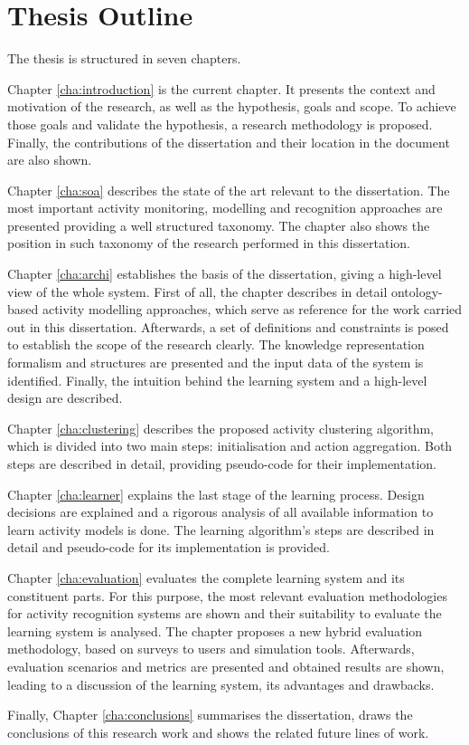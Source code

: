 \section{Thesis Outline}
\label{sec:intro:outline}

The thesis is structured in seven chapters.

Chapter \ref{cha:introduction} is the current chapter. It presents the context and motivation of the research, as well as the hypothesis, goals and scope. To achieve those goals and validate the hypothesis, a research methodology is proposed. Finally, the contributions of the dissertation and their location in the document are also shown.

Chapter \ref{cha:soa} describes the state of the art relevant to the dissertation. The most important activity monitoring, modelling and recognition approaches are presented providing a well structured taxonomy. The chapter also shows the position in such taxonomy of the research performed in this dissertation.

Chapter \ref{cha:archi} establishes the basis of the dissertation, giving a high-level view of the whole system. First of all, the chapter describes in detail ontology-based activity modelling approaches, which serve as reference for the work carried out in this dissertation. Afterwards, a set of definitions and constraints is posed to establish the scope of the research clearly. The knowledge representation formalism and structures are presented and the input data of the system is identified. Finally, the intuition behind the learning system and a high-level design are described.

Chapter \ref{cha:clustering} describes the proposed activity clustering algorithm, which is divided into two main steps: initialisation and action aggregation. Both steps are described in detail, providing pseudo-code for their implementation.

Chapter \ref{cha:learner} explains the last stage of the learning process. Design decisions are explained and a rigorous analysis of all available information to learn activity models is done. The learning algorithm's steps are described in detail and pseudo-code for its implementation is provided.

Chapter \ref{cha:evaluation} evaluates the complete learning system and its constituent parts. For this purpose, the most relevant evaluation methodologies for activity recognition systems are shown and their suitability to evaluate the learning system is analysed. The chapter proposes a new hybrid evaluation methodology, based on surveys to users and simulation tools. Afterwards, evaluation scenarios and metrics are presented and obtained results are shown, leading to a discussion of the learning system, its advantages and drawbacks.

Finally, Chapter \ref{cha:conclusions} summarises the dissertation, draws the conclusions of this research work and shows the related future lines of work.